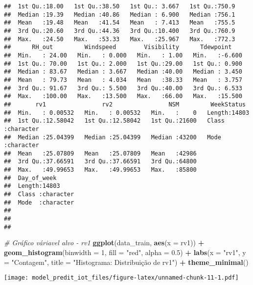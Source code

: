 \documentclass[
]{article}
\newenvironment{Shaded}{\begin{snugshade}}{\end{snugshade}}
\newcommand{\AttributeTok}[1]{\textcolor[rgb]{0.13,0.29,0.53}{#1}}
\newcommand{\CommentTok}[1]{\textcolor[rgb]{0.56,0.35,0.01}{\textit{#1}}}
\newcommand{\DecValTok}[1]{\textcolor[rgb]{0.00,0.00,0.81}{#1}}
\newcommand{\FloatTok}[1]{\textcolor[rgb]{0.00,0.00,0.81}{#1}}
\newcommand{\FunctionTok}[1]{\textcolor[rgb]{0.13,0.29,0.53}{\textbf{#1}}}
\newcommand{\NormalTok}[1]{#1}
\newcommand{\SpecialCharTok}[1]{\textcolor[rgb]{0.81,0.36,0.00}{\textbf{#1}}}
\newcommand{\StringTok}[1]{\textcolor[rgb]{0.31,0.60,0.02}{#1}}
\begin{document}
\begin{verbatim}
##  1st Qu.:18.00   1st Qu.:38.50   1st Qu.: 3.667   1st Qu.:750.9  
##  Median :19.39   Median :40.86   Median : 6.900   Median :756.1  
##  Mean   :19.48   Mean   :41.54   Mean   : 7.413   Mean   :755.5  
##  3rd Qu.:20.60   3rd Qu.:44.36   3rd Qu.:10.400   3rd Qu.:760.9  
##  Max.   :24.50   Max.   :53.33   Max.   :25.967   Max.   :772.3  
##      RH_out         Windspeed        Visibility      Tdewpoint     
##  Min.   : 24.00   Min.   : 0.000   Min.   : 1.00   Min.   :-6.600  
##  1st Qu.: 70.00   1st Qu.: 2.000   1st Qu.:29.00   1st Qu.: 0.900  
##  Median : 83.67   Median : 3.667   Median :40.00   Median : 3.450  
##  Mean   : 79.73   Mean   : 4.034   Mean   :38.33   Mean   : 3.757  
##  3rd Qu.: 91.67   3rd Qu.: 5.500   3rd Qu.:40.00   3rd Qu.: 6.533  
##  Max.   :100.00   Max.   :13.500   Max.   :66.00   Max.   :15.500  
##       rv1                rv2                NSM         WeekStatus       
##  Min.   : 0.00532   Min.   : 0.00532   Min.   :    0   Length:14803      
##  1st Qu.:12.58042   1st Qu.:12.58042   1st Qu.:21600   Class :character  
##  Median :25.04399   Median :25.04399   Median :43200   Mode  :character  
##  Mean   :25.07809   Mean   :25.07809   Mean   :42986                     
##  3rd Qu.:37.66591   3rd Qu.:37.66591   3rd Qu.:64800                     
##  Max.   :49.99653   Max.   :49.99653   Max.   :85800                     
##  Day_of_week       
##  Length:14803      
##  Class :character  
##  Mode  :character  
##                    
##                    
## 
\end{verbatim}

\begin{Shaded}
\begin{Highlighting}[]
\CommentTok{\# Gráfico váriavel alvo {-} rv1}
\FunctionTok{ggplot}\NormalTok{(data\_train, }\FunctionTok{aes}\NormalTok{(}\AttributeTok{x =}\NormalTok{ rv1)) }\SpecialCharTok{+}
  \FunctionTok{geom\_histogram}\NormalTok{(}\AttributeTok{binwidth =} \DecValTok{1}\NormalTok{, }\AttributeTok{fill =} \StringTok{"red"}\NormalTok{, }\AttributeTok{alpha =} \FloatTok{0.5}\NormalTok{) }\SpecialCharTok{+}
  \FunctionTok{labs}\NormalTok{(}\AttributeTok{x =} \StringTok{"rv1"}\NormalTok{, }\AttributeTok{y =} \StringTok{"Contagem"}\NormalTok{, }\AttributeTok{title =} \StringTok{"Histograma: Distribuição de rv1"}\NormalTok{) }\SpecialCharTok{+}
  \FunctionTok{theme\_minimal}\NormalTok{()}
\end{Highlighting}
\end{Shaded}

\texttt{[image: model\_predit\_iot\_files/figure-latex/unnamed-chunk-11-1.pdf]}
\end{document}
